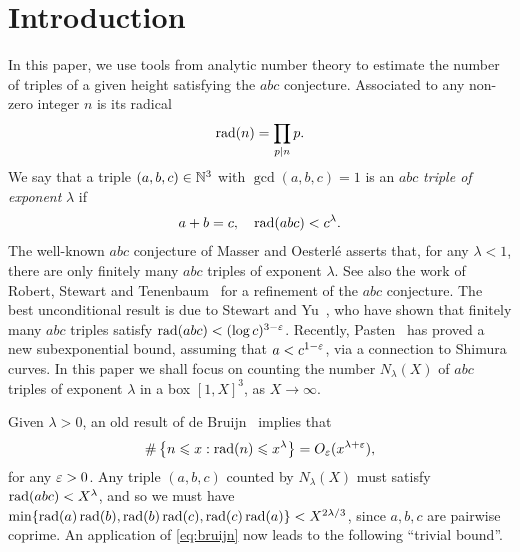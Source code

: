 %

\chapter{Introduction}

In this paper, we use tools from analytic number theory to estimate the number of triples of a given height satisfying the $abc$ conjecture.
Associated to any non-zero  integer $n$ is its radical
\begin{align*}
\operatorname{rad}(n)=\prod_{p\mid n}p.
\end{align*}
We say that a triple $(a,b,c)\in \mathbb{N}^3$
with $\gcd(a,b,c)=1$ is
 an $abc$ \emph{triple of exponent} $\lambda$ if
\begin{align*}
a+b=c,\quad \operatorname{rad}(abc) < c^{\lambda}.
\end{align*}
The well-known $abc$ conjecture of Masser and Oesterl\'e asserts that, for any $\lambda<1$, there are only finitely many $abc$ triples of exponent $\lambda$. See also the work of Robert, Stewart and Tenenbaum~\cite{tenenbaum} for a refinement of the $abc$ conjecture.
The   best unconditional result is  due to Stewart and Yu~\cite{styu}, who  have shown that  finitely many $abc$ triples satisfy $\operatorname{rad}(abc) < (\log c)^{3-\varepsilon}$. Recently, Pasten~\cite{hector} has proved a new subexponential bound, assuming that  $a<c^{1-\varepsilon}$, via a connection to Shimura curves.
In this paper we shall focus on counting the number $N_\lambda(X)$ of $abc$ triples of exponent $\lambda$ in a box $[1,X]^3$, as $X\to \infty$.

Given $\lambda>0$,
an old result of
de Bruijn~\cite{debruijn} implies that
\begin{equation}\label{eq:bruijn}
\#\left\{n\leqslant x : \operatorname{rad}(n)\leqslant x^\lambda\right\}=O_\varepsilon(x^{\lambda+\varepsilon}),
\end{equation}
for any $\varepsilon>0$. Any triple $(a,b,c)$ counted by
$N_\lambda(X)$ must satisfy $\operatorname{rad}(abc)< X^{\lambda}$, and so
we must have
$\min\{\operatorname{rad}(a)\operatorname{rad}(b),\operatorname{rad}(b)\operatorname{rad}(c),\operatorname{rad}(c)\operatorname{rad}(a)\}< X^{2\lambda/3}$, since $a,b,c$ are pairwise coprime.
An application of \eqref{eq:bruijn} now leads to the following ``trivial bound''.

